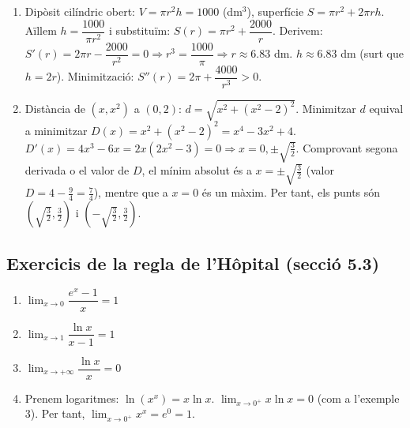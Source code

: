 \documentclass[12pt]{article}
\begin{document}

\begin{solucio}
\begin{enumerate}
    \item Dipòsit cilíndric obert: $V=\pi r^2 h=1000$ (dm$^3$), superfície $S=\pi r^2+2\pi r h$. Aïllem $h=\dfrac{1000}{\pi r^2}$ i substituïm: $S(r)=\pi r^2+\dfrac{2000}{r}$. Derivem: $S'(r)=2\pi r-\dfrac{2000}{r^2}=0 \Rightarrow r^3=\dfrac{1000}{\pi} \Rightarrow r\approx 6.83$ dm. $h\approx 6.83$ dm (surt que $h=2r$). Minimització: $S''(r)=2\pi+\dfrac{4000}{r^3}>0$.
    \item Distància de $(x,x^2)$ a $(0,2)$: $d=\sqrt{x^2+(x^2-2)^2}$. Minimitzar $d$ equival a minimitzar $D(x)=x^2+(x^2-2)^2 = x^4-3x^2+4$. $D'(x)=4x^3-6x=2x(2x^2-3)=0 \Rightarrow x=0, \pm\sqrt{\frac{3}{2}}$. Comprovant segona derivada o el valor de $D$, el mínim absolut és a $x=\pm\sqrt{\frac{3}{2}}$ (valor $D=4-\frac{9}{4}=\frac{7}{4}$), mentre que a $x=0$ és un màxim. Per tant, els punts són $\left(\sqrt{\frac{3}{2}},\frac{3}{2}\right)$ i $\left(-\sqrt{\frac{3}{2}},\frac{3}{2}\right)$.
\end{enumerate}
\end{solucio}

\subsection*{Exercicis de la regla de l'Hôpital (secció 5.3)}

\begin{solucio}
\begin{enumerate}
    \item $\lim_{x\to0} \dfrac{e^x-1}{x}=1$
    \item $\lim_{x\to1} \dfrac{\ln x}{x-1}=1$
    \item $\lim_{x\to+\infty} \dfrac{\ln x}{x}=0$
    \item Prenem logaritmes: $\ln(x^x)=x\ln x$. $\lim_{x\to0^+} x\ln x = 0$ (com a l'exemple 3). Per tant, $\lim_{x\to0^+} x^x = e^0 = 1$.
\end{enumerate}
\end{solucio}
\end{document}
